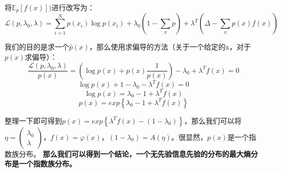\documentclass[a4paper]{article}
\begin{document}
将$\mathbb{E}_p[f(x)])$进行改写为：
\begin{equation}
    \mathcal{L}(p,\lambda_0, \lambda) = \sum_{i=1}^N p(x_i)\log p(x_i) + \lambda_0(1-\sum_{x} p)+\lambda^T(\Delta - \sum_x p(x)f(x))
\end{equation}

我们的目的是求一个$\hat{p}(x)$，那么使用求偏导的方法（关于一个给定的x，对于$p(x)$求偏导）：
\begin{equation}
    \frac{\mathcal{L}(p,\lambda_0, \lambda)}{p(x)}=\left( \log p(x) + p(x)\frac{1}{p(x)} \right) - \lambda_0 + \lambda^Tf(x) = 0
\end{equation}
\begin{equation}
    \log p(x) + 1 - \lambda_0 - \lambda^Tf(x) = 0
\end{equation}
\begin{equation}
    \log p(x) = \lambda_0 - 1 + \lambda^Tf(x) 
\end{equation}
\begin{equation}
    p(x) = exp\left\{\lambda_0 - 1 + \lambda^Tf(x)\right\} 
\end{equation}

整理一下即可得到$p(x) = exp\left\{\lambda^Tf(x) - ( 1 - \lambda_0) \right\} $，那么我们可以将$\eta = \begin{pmatrix} \lambda_0 \\ \lambda  \end{pmatrix}$，$f(x)=\varphi(x)$，$(1-\lambda_0)=A(\eta)$。很显然，$p(x)$是一个指数族分布。
\textbf{那么我们可以得到一个结论，一个无先验信息先验的分布的最大熵分布是一个指数族分布。}
\end{document}
